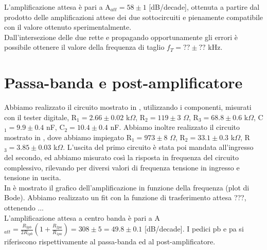 L'amplificazione attesa è pari a A$_{att} = 58 \pm 1$ [dB/decade], ottenuta a partire dal prodotto delle amplificazioni attese dei due sottocircuiti e pienamente compatibile con il valore ottenuto sperimentalmente.\\
Dall'intersezione delle due rette e propagando opportunamente gli errori è possibile ottenere il valore della frequenza di taglio $f_T = ?? \pm ??$ kHz.

\section{Passa-banda e post-amplificatore}
Abbiamo realizzato il circuito mostrato in , utilizzando i componenti, misurati con il tester digitale, R$_1 = 2.66 \pm 0.02$ k$\Omega$, R$_2 = 119 \pm 3$ $\Omega$, R$_3 = 68.8 \pm 0.6$ k$\Omega$, C$_1 = 9.9 \pm 0.4$ nF, C$_2 = 10.4 \pm 0.4$ nF. Abbiamo inoltre realizzato il circuito mostrato in , dove abbiamo impiegato R$_1 = 973 \pm 8$ $\Omega$, R$_2 = 33.1 \pm 0.3$ k$\Omega$, R$_3 = 3.85 \pm 0.03$ k$\Omega$. L'uscita del primo circuito è stata poi mandata all'ingresso del secondo, ed abbiamo misurato così la risposta in frequenza del circuito complessivo, rilevando per diversi valori di frequenza tensione in ingresso e tensione in uscita.\\
In  è mostrato il grafico dell'amplificazione in funzione della frequenza (plot di Bode). Abbiamo realizzato un fit con la funzione di trasferimento attesa ???, ottenendo ...\\ %
L'amplificazione attesa a centro banda è pari a A$_{att} = \frac{R_{3pb}}{2R_{1pb}} (1+\frac{R_{2pa}}{R_{1pa}}) = 308 \pm 5 = 49.8 \pm 0.1$ [dB/decade]. I pedici pb e pa si riferiscono rispettivamente al passa-banda ed al post-amplificatore.
